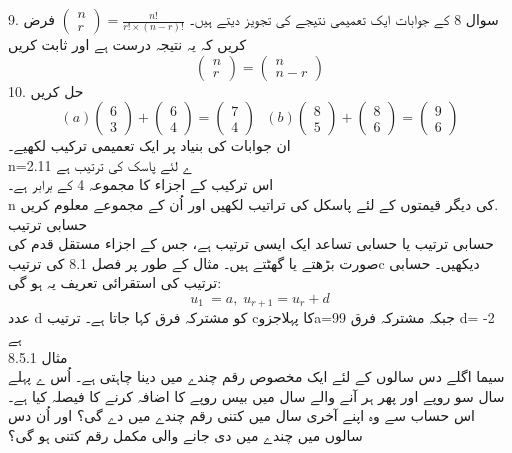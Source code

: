 9.	سوال 
8 کے جوابات ایک تعمیمی نتیجے کی تجویز دیتے ہیں۔
\(\begin{pmatrix}n \\ r\end{pmatrix} =\frac{n!}{r! \times (n  - r)!}\)
 فرض کریں کہ یہ نتیجہ درست ہے اور ثابت کریں\\
 \[\begin{pmatrix}n \\ r\end{pmatrix} = \begin{pmatrix}n \\ n - r\end{pmatrix}\]
10.	حل کریں\\
\[(a) \begin{pmatrix}6 \\ 3\end{pmatrix} + \begin{pmatrix}6 \\ 4\end{pmatrix} = \begin{pmatrix}7 \\ 4\end{pmatrix} \hspace{8pt} (b)\begin{pmatrix}8 \\ 5\end{pmatrix} + \begin{pmatrix}8 \\ 6\end{pmatrix} =\begin{pmatrix}9 \\ 6 \end{pmatrix}\]
ان جوابات کی بنیاد پر ایک تعمیمی ترکیب لکھیے۔\\
n=2.11
ے لئے پاسک کی ترتیب ہے\\
اس ترکیب کے اجزاء کا مجموعہ 4 کے برابر ہے۔\\
n
کی دیگر قیمتوں کے لئے پاسکل کی تراتیب لکھیں اور اُن کے مجموعے معلوم کریں.\\
حسابی ترتیب\\
حسابی ترتیب یا حسابی تساعد ایک ایسی ترتیب ہے، جس کے اجزاء مستقل قدم کی صورت بڑھتے یا گھٹتے ہیں۔ مثال کے طور پر فصل 8.1 کی ترتیبc دیکھیں۔ حسابی ترتیب کی استقرائی تعریف یہ ہو گی:\\
\[ u_{1} \ = a, \;  u_{r+1}  = u_{r} + d\]
عدد d کو مشترکہ فرق کہا جاتا ہے۔ ترتیب cکا پہلاجزوa=99 جبکہ مشترکہ فرق d= -2 ہے\\
مثال 
8.5.1\\
سیما اگلے دس سالوں کے لئے ایک مخصوص رقم چندے میں دینا چاہتی ہے۔ اُس ے پہلے سال سو روپے اور پھر ہر آنے والے سال میں بیس روپے کا اضافہ کرنے کا فیصلہ کیا ہے۔اس حساب سے وہ اپنے آخری سال میں کتنی رقم چندے میں دے گی؟ اور اُن دس سالوں میں چندے میں دی جانے والی مکمل رقم کتنی ہو گی؟\\
